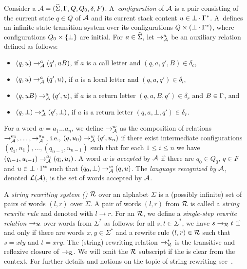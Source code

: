 Consider a \VPA $\mathcal{A} = (\widehat{\Sigma}, \Gamma, Q, Q_0, \delta, F)$.
 A~\emph{configuration} of $\mathcal{A}$ is a pair consisting of the current state $q\in Q$ of $\mathcal{A}$ and 
its current stack content $u\in \bot \cdot \Gamma^*$. 
A~\VPA defines an infinite-state transition system over its configurations $Q \times (\bot \cdot \Gamma^*)$, 
where configurations $Q_0 \times \{\bot\}$ are initial.
For $a \in \widehat{\Sigma}$, let $\rightarrow_{\mathcal{A}}^{a}$ be an auxiliary relation defined as follows:
\begin{itemize}
\item $(q,u) \rightarrow_{\mathcal{A}}^{a} (q',uB)$, if $a$ is a call letter and $(q,a,q',B) \in \delta_c$, 
\item $(q,u) \rightarrow_{\mathcal{A}}^{a} (q',u)$, if $a$ is a local letter and $(q,a,q') \in \delta_l$, 
\item $(q,uB) \rightarrow_{\mathcal{A}}^{a} (q',u)$, if $a$ is a return letter $(q,a,B,q') \in \delta_r$ and $B \in \Gamma$, and
\item $(q,\bot) \rightarrow_{\mathcal{A}}^{a} (q',\bot)$, if $a$ is a return letter $(q,a,\bot,q') \in \delta_r$.
\end{itemize}
For a word $w = a_1 \ldots a_n$, we define 
$\rightarrow_{\mathcal{A}}^{w}$ as the composition of relations $\rightarrow_{\mathcal{A}}^{a_1}, \dots, \rightarrow_{\mathcal{A}}^{a_n}$, i.e.,
$(q,u_0) \rightarrow_{\mathcal{A}}^{w} (q',u_n)$ if there exist intermediate configurations
$(q_1, u_1), \ldots, (q_{n-1}, u_{n-1})$ such that for each $1 \leq i \leq n$ we have $(q_{i-1}, u_{i-1}) \rightarrow_{\mathcal{A}}^{a_i}  (q_{i}, u_{i})$.
A word $w$ is \emph{accepted} by $\mathcal{A}$ if there are $q_0 \in Q_0$, $q \in F$ and $u \in \bot \cdot \Gamma^*$ such that $(q_0, \bot) \rightarrow_{\mathcal{A}}^{w} (q,u)$.
 The \emph{language recognized by $\mathcal{A}$}, denoted $\mathcal{L}(\mathcal{A})$, is the set of words accepted  by $\mathcal{A}$. 

A \emph{string rewriting system (\SRS)} $\mathcal{R}$ over an alphabet $\Sigma$ is 
a (possibly infinite) set of pairs of words $(l,r)$ over $\Sigma$.
A pair of words  $(l,r)$  from $\mathcal{R}$ is called a \emph{string rewrite rule} and denoted with $l \rightarrow r$.
For an \SRS $\mathcal{R}$, we define a \emph{single-step rewrite relation} $\rightarrow_{\mathcal{R}}$ over words from $\Sigma^*$ as follows:
for all $s,t \in \Sigma^*$, we have $s \rightarrow_{\mathcal{R}} t$ if and only if there are words $x,y \in \Sigma^*$ and a rewrite rule
$(l,r) \in \mathcal{R}$ such that $s = x l y$ and $t = x r y$. 
The (string) rewriting relation $\rightarrow^*_{\mathcal{R}}$ is the transitive and reflexive closure of $\rightarrow_{\mathcal{R}}$.
We will omit the $\mathcal{R}$ subscript if the \SRS is clear from the context. 
For further details and notions on the topic of string rewriting see~\cite{book1993string}.

